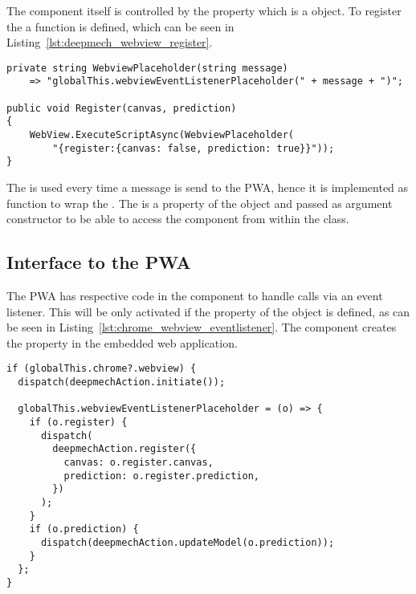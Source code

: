 The  component itself is controlled by the  property which is a  object.
To register the  a  function is defined, which can be seen in Listing~\ref{lst:deepmech_webview_register}.

\begin{lstlisting}[label={lst:deepmech_webview_register}, caption={DeepmechWebView Register function}]
private string WebviewPlaceholder(string message)
    => "globalThis.webviewEventListenerPlaceholder(" + message + ")";

public void Register(canvas, prediction)
{
    WebView.ExecuteScriptAsync(WebviewPlaceholder(
        "{register:{canvas: false, prediction: true}}"));
}
\end{lstlisting}

The  is used every time a message is send to the PWA, hence it is implemented as function to wrap the .
The  is a property of the  object and passed as argument constructor to be able to access the  component from within the class.

\subsection{Interface to the PWA} \label{ch:interface_to_the_pwa}

The PWA has respective code in the  component to handle calls via an event listener.
This will be only activated if the  property of the  object is defined, as can be seen in Listing~\ref{lst:chrome_webview_eventlistener}.
The  component creates the  property in the embedded web application.

\begin{lstlisting}[label={lst:chrome_webview_eventlistener}, caption={PWA event-handler for the chrome webview}]
if (globalThis.chrome?.webview) {
  dispatch(deepmechAction.initiate());

  globalThis.webviewEventListenerPlaceholder = (o) => {
    if (o.register) {
      dispatch(
        deepmechAction.register({
          canvas: o.register.canvas,
          prediction: o.register.prediction,
        })
      );
    }
    if (o.prediction) {
      dispatch(deepmechAction.updateModel(o.prediction));
    }
  };
}
\end{lstlisting}

